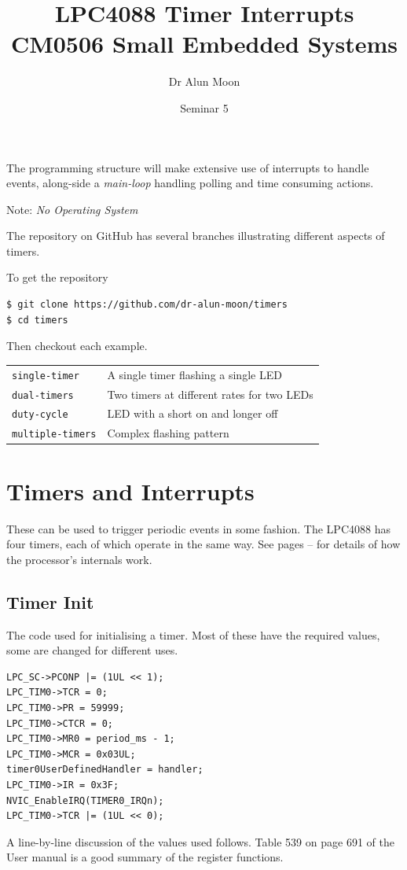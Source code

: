 \documentclass[a4paper]{tufte-handout}
\title{LPC4088 Timer Interrupts\\\small{CM0506 Small Embedded Systems}}
\author{Dr Alun Moon}
\date{Seminar 5}
\begin{document}
\maketitle

The programming structure will make extensive use of interrupts to
handle events, along-side a \emph{main-loop} handling polling and time
consuming actions.

Note: \emph{No Operating System}
\begin{tcolorbox}[colframe=SkyBlue,title=GitHub]
  The repository on GitHub has several branches illustrating different
  aspects of timers.
  
  To get the repository
  \begin{verbatim}
$ git clone https://github.com/dr-alun-moon/timers
$ cd timers
\end{verbatim}
Then checkout each example.\\
\begin{tabular}{ll}
  \texttt{single-timer} & A single timer flashing a single LED\\
  \texttt{dual-timers} & Two timers at different rates for two LEDs\\
  \texttt{duty-cycle} &  LED with a short on and longer off\\
  \texttt{multiple-timers} & Complex flashing pattern \\
\end{tabular}
\end{tcolorbox}
\section{Timers and Interrupts}
  These can be used to trigger periodic
events in some fashion.  The LPC4088 has four timers, each of which
operate in the same way.  See pages
\pageref{sec:timer-behavior}--\pageref{sec:timer-behavior-end} for
details of how the processor's internals work.

\subsection{Timer Init}
The code used for initialising a  timer.  Most of these have the
required values, some are changed for different uses.  
\begin{verbatim}
LPC_SC->PCONP |= (1UL << 1);
LPC_TIM0->TCR = 0;
LPC_TIM0->PR = 59999;
LPC_TIM0->CTCR = 0;
LPC_TIM0->MR0 = period_ms - 1;
LPC_TIM0->MCR = 0x03UL;
timer0UserDefinedHandler = handler;
LPC_TIM0->IR = 0x3F;
NVIC_EnableIRQ(TIMER0_IRQn);
LPC_TIM0->TCR |= (1UL << 0);
\end{verbatim}
A line-by-line discussion of the values used follows.  Table 539 on
page 691 of the User manual \citep{lpc4088} is a good summary of the
register functions.
\end{document}
